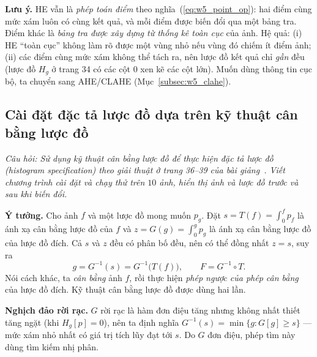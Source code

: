 \textbf{Lưu ý.} HE vẫn là \emph{phép toán điểm} theo nghĩa~(\ref{eq:w5_point_op}): hai điểm cùng mức xám luôn có cùng kết quả, và mỗi điểm được biến đổi qua một bảng tra. Điểm khác là \emph{bảng tra được xây dựng từ thống kê toàn cục} của ảnh. Hệ quả: (i) HE ``toàn cục'' không làm rõ được một vùng nhỏ nếu vùng đó chiếm ít điểm ảnh; (ii) các điểm cùng mức xám không thể tách ra, nên lược đồ kết quả chỉ \emph{gần} đều (lược đồ $H_g$ ở trang 34 có các cột $0$ xen kẽ các cột lớn). Muốn dùng thông tin cục bộ, ta chuyển sang AHE/CLAHE (Mục~\ref{subsec:w5_clahe}).

\subsection{Cài đặt đặc tả lược đồ dựa trên kỹ thuật cân bằng lược đồ}
\label{subsec:w5_hist_spec}

\textit{Câu hỏi: Sử dụng kỹ thuật cân bằng lược đồ để thực hiện đặc tả lược đồ (histogram specification) theo giải thuật ở trang 36--39 của bài giảng~\citep{xlav_lec3}. Viết chương trình cài đặt và chạy thử trên $10$ ảnh, hiển thị ảnh và lược đồ trước và sau khi biến đổi.}

\textbf{Ý tưởng.} Cho ảnh $f$ và một lược đồ mong muốn $p_g$. Đặt $s = T(f) = \int_0^f p_f$ là ánh xạ cân bằng lược đồ của $f$ và $z = G(g) = \int_0^g p_g$ là ánh xạ cân bằng lược đồ của lược đồ đích. Cả $s$ và $z$ đều có phân bố đều, nên có thể đồng nhất $z = s$, suy ra
\begin{equation}
g = G^{-1}(s) = G^{-1}\big(T(f)\big), \qquad F = G^{-1} \circ T.
\label{eq:w5_spec}
\end{equation}
Nói cách khác, ta \emph{cân bằng} ảnh $f$, rồi thực hiện \emph{phép ngược của phép cân bằng} của lược đồ đích. Kỹ thuật cân bằng lược đồ được dùng hai lần.

\textbf{Nghịch đảo rời rạc.} $G$ rời rạc là hàm đơn điệu tăng nhưng không nhất thiết tăng ngặt (khi $H_g[p] = 0$), nên ta định nghĩa $G^{-1}(s) = \min\{g : G[g] \ge s\}$ — mức xám nhỏ nhất có giá trị tích lũy đạt tới $s$. Do $G$ đơn điệu, phép tìm này dùng tìm kiếm nhị phân.


